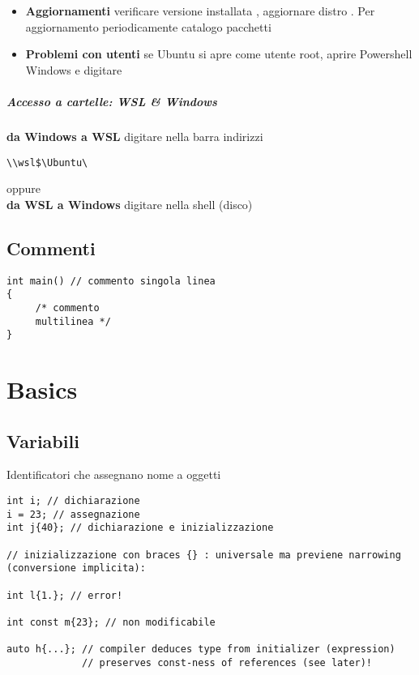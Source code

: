 \documentclass[10pt, oneside]{Book}
\begin{document}
\begin{itemize}
\item \textbf{Aggiornamenti} verificare versione installata , aggiornare distro . Per aggiornamento periodicamente catalogo pacchetti  

\item \textbf{Problemi con utenti} se Ubuntu si apre come utente root, aprire Powershell Windows e digitare 
\\
\end{itemize}

\paragraph{Accesso a cartelle: WSL \& Windows} \textbf{da Windows a WSL} digitare nella barra indirizzi \begin{verbatim}
\\wsl$\Ubuntu\
\end{verbatim}
oppure  
\\\textbf{da WSL a Windows} digitare nella shell \boxed{\texttt{cd /mnt/C/}} (disco)

\section{Commenti}
\begin{verbatim}
int main() // commento singola linea
{ 
     /* commento
     multilinea */
}
\end{verbatim}

\chapter{Basics}

\section{Variabili}
Identificatori che assegnano nome a oggetti
\\\begin{verbatim}
int i; // dichiarazione
i = 23; // assegnazione
int j{40}; // dichiarazione e inizializzazione

// inizializzazione con braces {} : universale ma previene narrowing (conversione implicita):

int l{1.}; // error!

int const m{23}; // non modificabile

auto h{...}; // compiler deduces type from initializer (expression)
             // preserves const-ness of references (see later)!
\end{verbatim}
\end{document}
